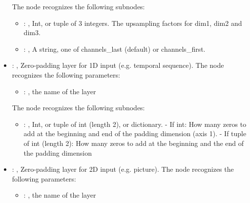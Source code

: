 \begin{itemize}
      The  node recognizes the following subnodes:
      \begin{itemize}
        \item {}: , 
          Int, or tuple of 3 integers. The upsampling factors for dim1, dim2 and dim3.

        \item {}: , 
          A string, one of channels\_last (default) or channels\_first.
      \end{itemize}

    \item {}: , 
      Zero-padding layer for 1D input (e.g. temporal sequence).
      The  node recognizes the following parameters:
        \begin{itemize}
          \item {}: , 
            the name of the layer
      \end{itemize}

      The  node recognizes the following subnodes:
      \begin{itemize}
        \item {}: , 
          Int, or tuple of int (length 2), or dictionary. - If int: How many zeros to add at the
          beginning         and end of the padding dimension (axis 1). - If tuple of int (length 2):
          How many zeros to add at the beginning         and the end of the padding dimension
      \end{itemize}

    \item {}: , 
      Zero-padding layer for 2D input (e.g. picture).
      The  node recognizes the following parameters:
        \begin{itemize}
          \item {}: , 
            the name of the layer
      \end{itemize}


\end{itemize}
